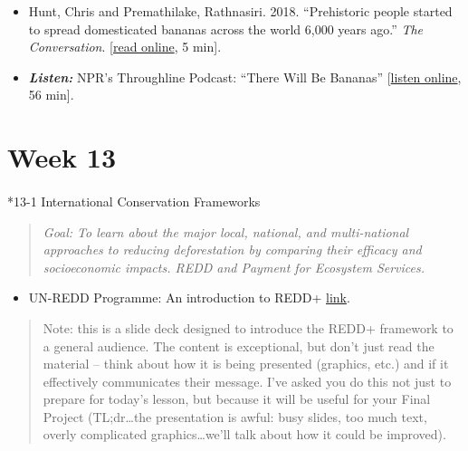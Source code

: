 \documentclass[
  10pt,
  letterpaper,
  oneside,
  open=any]{scrbook}
\makeatletter
\let\oldparagraph\paragraph
\renewcommand{\paragraph}{
    \@ifstar
      \xxxParagraphStar
      \xxxParagraphNoStar
  }
\newcommand{\xxxParagraphStar}[1]{\oldparagraph*{#1}\mbox{}}
\newcommand{\xxxParagraphNoStar}[1]{\oldparagraph{#1}\mbox{}}
\providecommand{\tightlist}{%
  \setlength{\itemsep}{0pt}\setlength{\parskip}{0pt}}
\makeatother
\begin{document}
\begin{itemize}
\item
  Hunt, Chris and Premathilake, Rathnasiri. 2018. ``Prehistoric people
  started to spread domesticated bananas across the world 6,000 years
  ago.'' \emph{The Conversation}.
  {[}\href{https://theconversation.com/prehistoric-people-started-to-spread-domesticated-bananas-across-the-world-6-000-years-ago-99547}{read
  online}, 5 min{]}.
\item
  \textbf{\emph{Listen:}} NPR's Throughline Podcast: ``There Will Be
  Bananas''
  {[}\href{https://www.npr.org/2020/01/07/794302086/there-will-be-bananas}{listen
  online}, 56 min{]}.
\end{itemize}

\section*{Week 13}\label{week-13}


\paragraph*{13-1 International Conservation
Frameworks}\label{international-conservation-frameworks}

\begin{quote}
\emph{Goal: To learn about the major local, national, and multi-national
approaches to reducing deforestation by comparing their efficacy and
socioeconomic impacts. REDD and Payment for Ecosystem Services.}
\end{quote}

\begin{itemize}
\tightlist
\item
  UN-REDD Programme: An introduction to REDD+
  \href{https://www.un-redd.org/sites/default/files/2021-10/1.\%20Introduction\%20to\%20REDD\%2B_Tim\%20Christophersen.pdf}{link}.
\end{itemize}

\begin{quote}
Note: this is a slide deck designed to introduce the REDD+ framework to
a general audience. The content is exceptional, but don't just read the
material -- think about how it is being presented (graphics, etc.) and
if it effectively communicates their message. I've asked you do this not
just to prepare for today's lesson, but because it will be useful for
your Final Project (TL;dr\ldots the presentation is awful: busy slides,
too much text, overly complicated graphics\ldots we'll talk about how it
could be improved).
\end{quote}
\end{document}
